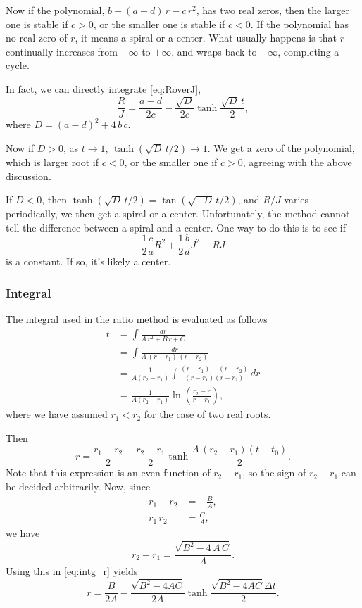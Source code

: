 \documentclass{book}
\begin{document}
Now if the polynomial, $b + (a - d) \, r - c \, r^2$,
has two real zeros, then the larger one is stable if $c > 0$,
or the smaller one is stable if $c < 0$.
%
If the polynomial has no real zero of $r$, it means a spiral or a center.
What usually happens is that $r$ continually increases
from $-\infty$ to $+\infty$, and wraps back to $-\infty$,
completing a cycle.


In fact, we can directly integrate \eqref{eq:RoverJ},
$$
\frac{R}{J}
=
\frac{a - d}{2 c}
-\frac{ \sqrt D }{2 c}
\tanh\frac{ \sqrt D \, t } { 2 },
$$
where $D = (a - d)^2 + 4 \, b \, c$.


Now if $D > 0$, as $t \rightarrow 1$, $\tanh (\sqrt D \,t /2) \rightarrow 1$.
We get a zero of the polynomial, which is larger root if $c < 0$,
or the smaller one if $c > 0$, agreeing with the above discussion.

If $D < 0$, then $\tanh(\sqrt D \, t/2) = \tan(\sqrt{-D} \, t/2)$,
and $R/J$ varies periodically, we then get a spiral or a center.
Unfortunately, the method cannot tell the difference between
a spiral and a center.  One way to do this is to see if
$$
\frac{1}{2} \frac{c}{a} R^2 + \frac{1}{2} \frac{b}{d} J^2 - R J
$$
is a constant.  If so, it's likely a center.



\subsubsection{Integral}


The integral used in the ratio method is evaluated as follows
$$
\begin{aligned}
t &= \int \frac { dr } { A \, r^2 + B \, r + C } \\
  &= \int \frac { dr } { A \, (r - r_1) \, (r - r_2) } \\
  &= \frac{1}{A(r_2 - r_1)}
  \int \frac{ (r - r_1) - (r - r_2) }
  { (r - r_1) (r - r_2) } \, d r \\
  &= \frac{1}{A(r_2 - r_1) }
  \ln \left( \frac{ r_2 - r } { r - r_1 } \right),
\end{aligned}
$$
where we have assumed $r_1 < r_2$ for the case of two real roots.

Then
\begin{equation}
r =
\frac{r_1 + r_2}{2}
-
\frac{r_2 - r_1}{2}
\tanh\frac{A \, (r_2 - r_1) (t - t_0)}{2}.
\label{eq:intg_r}
\end{equation}
Note that this expression is an even function of $r_2 - r_1$,
so the sign of $r_2 - r_1$ can be decided arbitrarily.
%
Now, since
$$
\begin{aligned}
  r_1 + r_2 &= - \frac B A, \\
  r_1 \, r_2 &= \frac C A,
\end{aligned}
$$
we have
$$
r_2 - r_1 = \frac{ \sqrt{ B^2 - 4 \, A \, C } }{ A }.
$$
Using this in \eqref{eq:intg_r} yields
$$
r = \frac{B}{2A} - \frac{\sqrt{B^2 - 4AC}}{2A} \tanh\frac{\sqrt{B^2 -4AC}\Delta t}{2}.
$$
\end{document}
